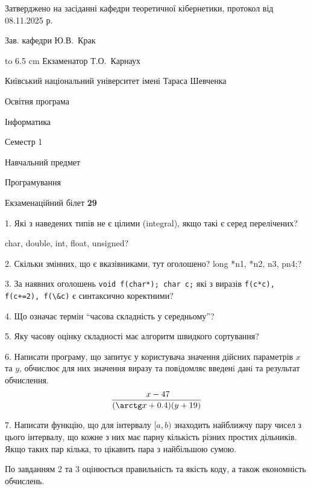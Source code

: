 \documentclass[12pt, ukrainian]{article}
\def\code#1{\Verb!#1!}
\begin{document}
{\smallskip\smallskip \begin {scriptsize} Затверджено на засіданні кафедри теоретичної кібернетики, протокол   від   08.11.2025 р.\par\smallskip\smallskip\smallskip\smallskip
{\parbox {6.5 cm} {Зав. кафедри \dotfill Ю.В.~Крак}}\hspace {0.7cm} {\hbox to 6.5 cm { Екзаменатор \dotfill Т.О.~Карнаух}} \end{scriptsize}}
\newpage
{{\begin {scriptsize}\par
{ \center  Київський національний університет імені Тараса Шевченка \par}
{\parbox {5 cm}{Освітня програма \hfill}{\parbox {7 cm}{Інформатика\hfill}}\parbox {6 cm}{\hfill Семестр 1}}\par
{\parbox {5 cm} {Навчальний предмет \hfill}\parbox {7 cm}{Програмування \hfill}\parbox {6cm}{\hfill}\par}\vspace{-15pt} \end{scriptsize}}{\center Екзаменаційний білет \No \textbf { 29 }\par}}
{%
1. Які з наведених типів не є цілими (integral), якщо такі є серед перелічених?

char, double, int, float, unsigned?
\par
\vspace{2mm}
2. Скільки змінних, що є вказівниками, тут оголошено?
long *n1, *n2, n3, pn4;?
\par
\vspace{2mm}
3. За наявних оголошень \code{void f(char*); char c;} які з виразів \code{f(c*c), f(c+=2), f(\&c)} є синтаксично коректними?
\par
\vspace{2mm}
4. Що означає термін ``часова складність у середньому''?
\par
\vspace{2mm}
5. Яку часову оцінку складності має алгоритм швидкого сортування?
\par
\vspace{2mm}
6. Написати програму, що запитує у користувача значення дійсних параметрів $x$ та $y$, обчислює для них значення виразу та повiдомляє введенi данi та результат обчислення.
$$\frac{\ x - 47}{(\arctg x + 0.4) (y + 19)}$$ 

\par
7. Написати функцію, що для інтервалу $[a, b)$ знаходить найближчу пару чисел з цього інтервалу, що кожне з них має парну кількість різних простих дільників. Якщо таких пар кілька, то цікавить пара з найбільшою сумою.

По завданням 2 та 3 оцінюється правильність та якість коду, а також економність обчислень.

}
\end{document}
